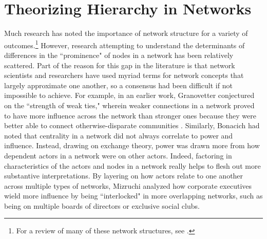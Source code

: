\documentclass[3p,times]{elsarticle}
\begin{document}

 

\section{Theorizing Hierarchy in Networks}
Much research has noted the importance of network structure for a variety of outcomes.\footnote{For a review of many of these network structures, see \cite{smith2005networks}.} However, research attempting to understand the determinants of differences in the ``prominence" of nodes in a network has been relatively scattered. Part of the reason for this gap in the literature is that network scientists and researchers have used myriad terms for network concepts that largely approximate one another, so a consensus had been difficult if not impossible to achieve. For example, in an earlier work, Granovetter conjectured on the ``strength of weak ties," wherein weaker connections in a network proved to have more influence across the network than stronger ones because they were better able to connect otherwise-disparate communities \cite{granovetter1973strength}. Similarly, Bonacich \cite{bonacich1987power} had noted that centrality in a network did not always correlate to power and influence. Instead, drawing on exchange theory, power was drawn more from how dependent actors in a network were on other actors. Indeed, factoring in characteristics of the actors and nodes in a network really helps to flesh out more substantive interpretations. By layering on how actors relate to one another across multiple types of networks, Mizruchi \cite{mizruchi1996interlocks} analyzed how corporate executives wield more influence by being ``interlocked" in more overlapping networks, such as being on multiple boards of directors or exclusive social clubs.
\end{document}
